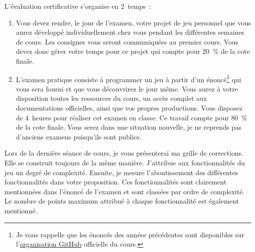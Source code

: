 L’évaluation certificative s'organise en 2~temps~:
\begin{enumerate}
    \item Vous devez rendre, le jour de l'examen, votre projet de jeu personnel que vous aurez développé individuellement chez vous pendant les différentes semaines de cours. Les consignes vous seront communiquées au premier cours. Vous devez donc gérer votre temps pour ce projet qui compte pour 20~\% de la cote finale.
    \item L'examen pratique consiste à programmer un jeu à partir d'un énoncé\footnote{Je vous rappelle que les énoncés des années précédentes sont disponibles sur l'\href{https://github.com/tecg-mmi}{organisation GitHub} officielle du cours.} qui vous sera fourni et que vous découvrirez le jour même. Vous aurez à votre disposition toutes les ressources du cours, un accès complet aux documentations officielles, ainsi que vos propres productions. Vous disposez de 4~heures pour réaliser cet examen en classe. Ce travail compte pour 80~\% de la cote finale. Vous serez dans une situation nouvelle, je ne reprends pas d'anciens examens puisqu'ils sont publics.
\end{enumerate}
Lors de la dernière séance de cours, je vous présenterai ma grille de corrections. Elle se construit toujours de la même manière. J'attribue aux fonctionnalités du jeu un degré de complexité. Ensuite, je mesure l'aboutissement des différentes fonctionnalités dans votre proposition. Ces fonctionnalités sont clairement mentionnées dans l'énoncé de l'examen et sont classées par ordre de complexité. Le nombre de points maximum attribué à chaque fonctionnalité est également mentionné.


